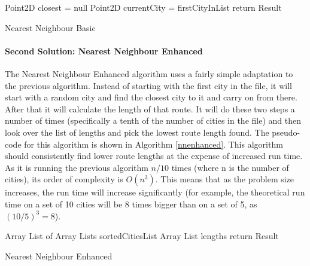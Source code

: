 \documentclass[conference,backref=page]{acmsiggraph}
\begin{document}
\begin{algorithm}[h]
	Point2D closest = null\;
	Point2D currentCity = firstCityInList\;
	return Result\;
	\caption{Nearest Neighbour Basic}
	\label{nnbasic}
\end{algorithm}

\paragraph{Second Solution: Nearest Neighbour Enhanced}
The Nearest Neighbour Enhanced algorithm uses a fairly simple adaptation to the previous algorithm. Instead of starting with the first city in the file, it will start with a random city and find the closest city to it and carry on from there. After that it will calculate the length of that route. It will do these two steps a number of times (specifically a tenth of the number of cities in the file) and then look over the list of lengths and pick the lowest route length found. The pseudo-code for this algorithm is shown in Algorithm \ref{nnenhanced}. This algorithm should consistently find lower route lengths at the expense of increased run time. As it is running the previous algorithm $n/10$ times (where n is the number of cities), its order of complexity is $O(n^3)$. This means that as the problem size increases, the run time will increase significantly (for example, the theoretical run time on a set of 10 cities will be 8 times bigger than on a set of 5, as $(10/5)^3 = 8$).

\begin{algorithm}[h]
	Array List of Array Lists sortedCitiesList\;
	Array List lengths\;
	return Result\;
	\caption{Nearest Neighbour Enhanced}
	\label{nnenhanced}
\end{algorithm}
\end{document}
